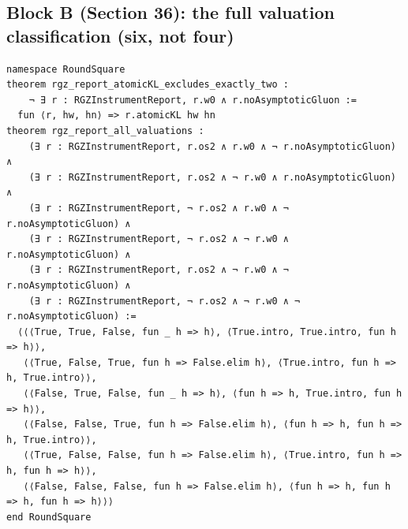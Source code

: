 \documentclass[11pt,a4paper]{article}
\theoremstyle{plain}
\theoremstyle{definition}
\theoremstyle{remark}
\renewcommand{\_}{\oldunderscore\allowbreak}
\begin{document}
\subsection{Block B (Section 36): the full valuation classification (six, not four)}
\begin{lstlisting}
namespace RoundSquare
theorem rgz_report_atomicKL_excludes_exactly_two :
    ¬ ∃ r : RGZInstrumentReport, r.w0 ∧ r.noAsymptoticGluon :=
  fun ⟨r, hw, hn⟩ => r.atomicKL hw hn
theorem rgz_report_all_valuations :
    (∃ r : RGZInstrumentReport, r.os2 ∧ r.w0 ∧ ¬ r.noAsymptoticGluon) ∧
    (∃ r : RGZInstrumentReport, r.os2 ∧ ¬ r.w0 ∧ r.noAsymptoticGluon) ∧
    (∃ r : RGZInstrumentReport, ¬ r.os2 ∧ r.w0 ∧ ¬ r.noAsymptoticGluon) ∧
    (∃ r : RGZInstrumentReport, ¬ r.os2 ∧ ¬ r.w0 ∧ r.noAsymptoticGluon) ∧
    (∃ r : RGZInstrumentReport, r.os2 ∧ ¬ r.w0 ∧ ¬ r.noAsymptoticGluon) ∧
    (∃ r : RGZInstrumentReport, ¬ r.os2 ∧ ¬ r.w0 ∧ ¬ r.noAsymptoticGluon) :=
  ⟨⟨⟨True, True, False, fun _ h => h⟩, ⟨True.intro, True.intro, fun h => h⟩⟩,
   ⟨⟨True, False, True, fun h => False.elim h⟩, ⟨True.intro, fun h => h, True.intro⟩⟩,
   ⟨⟨False, True, False, fun _ h => h⟩, ⟨fun h => h, True.intro, fun h => h⟩⟩,
   ⟨⟨False, False, True, fun h => False.elim h⟩, ⟨fun h => h, fun h => h, True.intro⟩⟩,
   ⟨⟨True, False, False, fun h => False.elim h⟩, ⟨True.intro, fun h => h, fun h => h⟩⟩,
   ⟨⟨False, False, False, fun h => False.elim h⟩, ⟨fun h => h, fun h => h, fun h => h⟩⟩⟩
end RoundSquare
\end{lstlisting}
\end{document}
